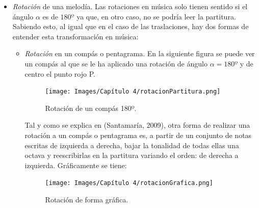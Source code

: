 \documentclass[a4paper, openright, 11pt, titlepage]{report}
\theoremstyle{definition}\newtheorem{defin}[propo]{Definition}
\theoremstyle{definition}\newtheorem{obser}[propo]{Remark}
\theoremstyle{definition}\newtheorem{ejem}[propo]{Ejemplo}
\theoremstyle{definition}\newtheorem{algoritmo}[propo]{Algoritmo}
\begin{document}
\begin{itemize}
\begin{enumerate}
    \end{enumerate}
    \item \textit{Rotación} de una melodía. Las rotaciones en música solo tienen sentido si el ángulo $\alpha$ es de $180º$ ya que, en otro caso, no se podría leer la partitura. Sabiendo esto, al igual que en el caso de las traslaciones, hay dos formas de entender esta transformación en música:
    \begin{itemize}
        \item \textit{Rotación} en un compás o pentagrama. En la siguiente figura se puede ver un compás al que se le ha aplicado una rotación de ángulo $\alpha = 180º$ y de centro el punto rojo P.
        \begin{figure}[H]
            \centering
            \texttt{[image: Images/Capítulo 4/rotacionPartitura.png]}
            \caption{Rotación de un compás 180º.}
        \end{figure}
        Tal y como se explica en \cite{didactica} (Santamaría, 2009), otra forma de realizar una rotación a un compás o pentagrama es, a partir de un conjunto de notas escritas de izquierda a derecha, bajar la tonalidad de todas ellas una octava y reescribirlas en la partitura variando el orden: de derecha a izquierda. Gráficamente se tiene:
        \begin{figure}[H]
            \centering
            \texttt{[image: Images/Capítulo 4/rotacionGrafica.png]}
            \caption{Rotación de forma gráfica. \cite{didactica}}
        \end{figure}
        

\end{itemize}
\end{itemize}
\end{document}
